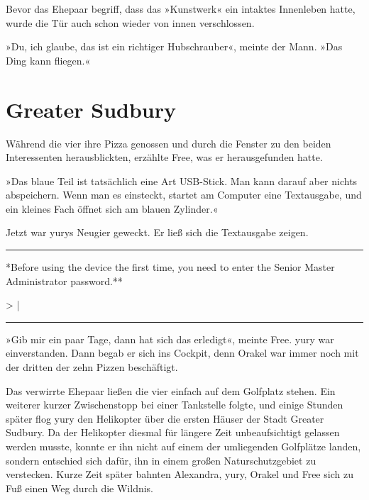 Bevor das Ehepaar begriff, dass das »Kunstwerk« ein intaktes Innenleben hatte, wurde die Tür auch schon wieder von innen verschlossen.

»Du, ich glaube, das ist ein richtiger Hubschrauber«, meinte der Mann. »Das Ding kann fliegen.«


\chapter{Greater Sudbury}

Während die vier ihre Pizza genossen und durch die Fenster zu den beiden Interessenten herausblickten, erzählte Free, was er herausgefunden hatte.

»Das blaue Teil ist tatsächlich eine Art USB-Stick. Man kann darauf aber nichts abspeichern. Wenn man es einsteckt, startet am Computer eine Textausgabe, und ein kleines Fach öffnet sich am blauen Zylinder.«

Jetzt war yurys Neugier geweckt. Er ließ sich die Textausgabe zeigen.

\noindent \parbox{\textwidth}{ \vspace{3ex} \hrule \vspace{3ex}

    \begin{footnotesize}
    \begin{ttfamily}

\noindent **Before using the device the first time, you need to enter the Senior Master Administrator password.**

\noindent > |

    \end{ttfamily}
    \end{footnotesize}

\vspace{3ex} \hrule \vspace{3ex} }

»Gib mir ein paar Tage, dann hat sich das erledigt«, meinte Free. yury war einverstanden. Dann begab er sich ins Cockpit, denn Orakel war immer noch mit der dritten der zehn Pizzen beschäftigt.

Das verwirrte Ehepaar ließen die vier einfach auf dem Golfplatz stehen. Ein weiterer kurzer Zwischenstopp bei einer Tankstelle folgte, und einige Stunden später flog yury den Helikopter über die ersten Häuser der Stadt Greater Sudbury. Da der Helikopter diesmal für längere Zeit unbeaufsichtigt gelassen werden musste, konnte er ihn nicht auf einem der umliegenden Golfplätze landen, sondern entschied sich dafür, ihn in einem großen Naturschutzgebiet zu verstecken. Kurze Zeit später bahnten Alexandra, yury, Orakel und Free sich zu Fuß einen Weg durch die Wildnis.


